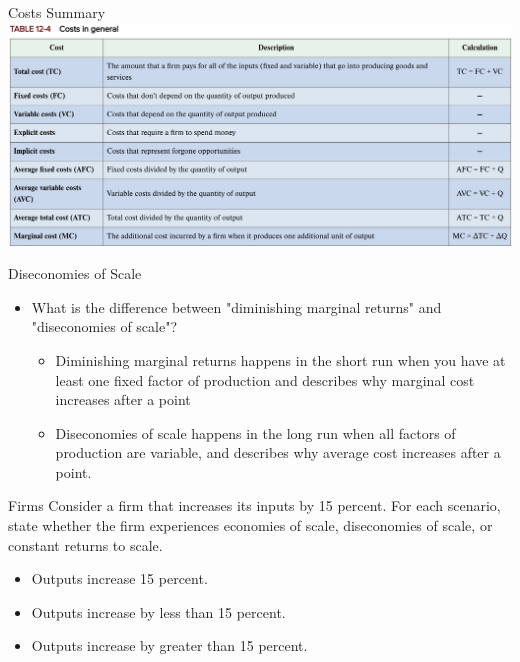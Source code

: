 \documentclass{beamer}
\begin{document}
\begin{frame}{Costs Summary}
    \includegraphics[scale = .3]{images/table_costs.png}
\end{frame}

\begin{frame}{Diseconomies of Scale}
    \begin{itemize}
        \item What is the difference between "diminishing marginal returns" and "diseconomies of scale"?
        \begin{itemize}
            \item Diminishing marginal returns happens in the short run when you have at least one fixed factor of production and describes why marginal cost increases after a point
            \item Diseconomies of scale happens in the long run when all factors of production are variable, and describes why average cost increases after a point.
        \end{itemize}
    \end{itemize}
\end{frame}

\begin{frame}{Firms}
    Consider a firm that increases its inputs by 15 percent. For each scenario, state whether the firm experiences economies of scale, diseconomies of scale, or constant returns to scale.
    \begin{itemize}
        \item Outputs increase 15 percent.
        \item Outputs increase by less than 15 percent.
        \item Outputs increase by greater than 15 percent.
    \end{itemize}
\end{frame}
\end{document}
